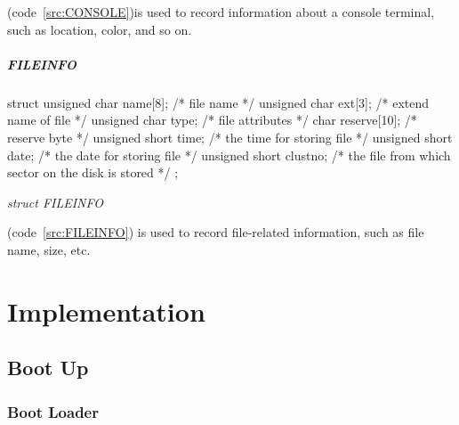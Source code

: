 \documentclass{swfcthesis}
\begin{document}
(code~\ref{src:CONSOLE})is used to record information about a console terminal, such as location,
color, and so on.




\paragraph{FILEINFO}

\begin{listing}[H]
  \begin{codeblock}
\begin{ccode}
struct
{ 
  unsigned char name[8];   /* file name */
  unsigned char ext[3];    /* extend name of file */
  unsigned char type;      /* file attributes */
  char reserve[10];        /* reserve byte */
  unsigned short time;     /* the time for storing file */
  unsigned short date;     /* the date for storing file */
  unsigned short  clustno; /* the file from which sector on the disk is stored */
};
\end{ccode}
  \end{codeblock}
  \caption{\emph{struct FILEINFO}}\label{src:FILEINFO}
\end{listing}

(code~\ref{src:FILEINFO}) is used to record file-related information, such as file name, size,
etc.
\fi %


    




\chapter{Implementation}

\section{Boot Up}
\label{sec:boot-up-1}

\subsection{Boot Loader}
\label{sec:boot-loader}
\end{document}
